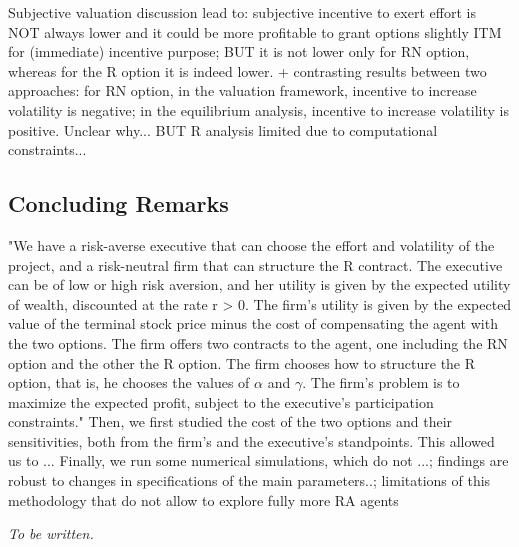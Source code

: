 Subjective valuation discussion lead to: subjective incentive to exert effort is NOT always lower and it could be more profitable to grant options slightly ITM for (immediate) incentive purpose; BUT it is not lower only for RN option, whereas for the R option it is indeed lower.
+ contrasting results between two approaches: for RN option, in the valuation framework, incentive to increase volatility is negative; in the equilibrium analysis, incentive to increase volatility is positive. Unclear why...
    BUT R analysis limited due to computational constraints...

\subsection*{Concluding Remarks}
"We have a risk-averse executive that can choose the effort and volatility of the project, and a risk-neutral firm that can structure the R contract. The executive can be of low or high risk aversion, and her utility is given by the expected utility of wealth, discounted at the rate r > 0. The firm’s utility is given by the expected value of the terminal stock price minus the cost of compensating the agent with the two options. The firm offers two contracts to the agent, one including the RN option and the other the R option. The firm chooses how to structure the R option, that is, he chooses the values of $\alpha$ and $\gamma$. The firm’s problem is to maximize the expected profit, subject to the executive’s participation constraints."
Then, we first studied the cost of the two options and their sensitivities, both from the firm's and the executive's standpoints. This allowed us to ...
Finally, we run some numerical simulations, which do not ...; findings are robust to changes in specifications of the main parameters..; limitations of this methodology that do not allow to explore fully more RA agents



\textit{To be written.}



